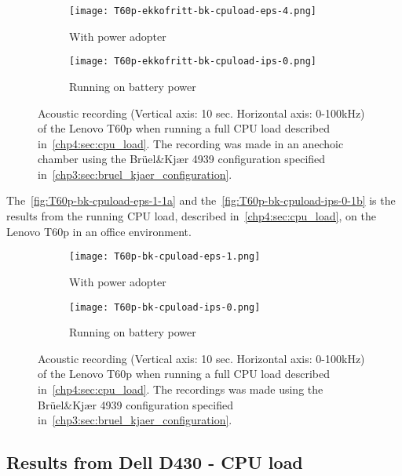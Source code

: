 \begin{figure}[ht]
	\begin{subfigure}{0.5\textwidth}
	    \centering
	    \texttt{[image: T60p-ekkofritt-bk-cpuload-eps-4.png]}
	    \caption{With power adopter}
	    \label{fig:T60p-ekkofritt-bk-cpuload-eps-4}
    \end{subfigure}
    \begin{subfigure}{0.5\textwidth}
	    \centering
	    \texttt{[image: T60p-ekkofritt-bk-cpuload-ips-0.png]}
	    \caption{Running on battery power}
	    \label{fig:T60p-ekkofritt-bk-cpuload-ips-0}
    \end{subfigure}
    \caption{Acoustic recording (Vertical axis: 10 sec. Horizontal axis: 0-100kHz) of the Lenovo T60p when running a full CPU load described in~\autoref{chp4:sec:cpu_load}. The recording was made in an anechoic chamber using the Brüel\&Kjær 4939 configuration specified in~\autoref{chp3:sec:bruel_kjaer_configuration}.}
	\label{fig:T60p-ekkofritt-bk-cpuload}
\end{figure}
The~\autoref{fig:T60p-bk-cpuload-eps-1-1a} and the~\autoref{fig:T60p-bk-cpuload-ips-0-1b} is the results from the running CPU load, described in~\autoref{chp4:sec:cpu_load}, on the Lenovo T60p in an office environment. 
\begin{figure}[ht]
	\begin{subfigure}{0.5\textwidth}
	    \centering
	    \texttt{[image: T60p-bk-cpuload-eps-1.png]}
	    \caption{With power adopter}
	    \label{fig:T60p-bk-cpuload-eps-1-1a}
    \end{subfigure}
    \begin{subfigure}{0.5\textwidth}
	    \centering
	    \texttt{[image: T60p-bk-cpuload-ips-0.png]}
	    \caption{Running on battery power}
	    \label{fig:T60p-bk-cpuload-ips-0-1b}
    \end{subfigure}
    \caption{Acoustic recording (Vertical axis: 10 sec. Horizontal axis: 0-100kHz) of the Lenovo T60p when running a full CPU load described in~\autoref{chp4:sec:cpu_load}. The recordings was made using the Brüel\&Kjær 4939 configuration specified in~\autoref{chp3:sec:bruel_kjaer_configuration}. }
	\label{fig:T60p-bk-cpuload}
\end{figure}


\subsection{Results from Dell D430 - CPU load}\label{chp5:subsec:d430_bk_results_cpuload}

